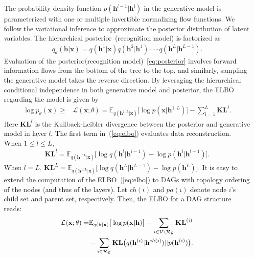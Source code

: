 \documentclass[twoside]{article}
\begin{document}
The  probability  density function $p(\mathbf{h}^{l-1} | \mathbf{h}^{l})$ in the generative model is parameterized with one or multiple invertible normalizing flow functions.  We follow the variational inference  to approximate the posterior distribution of latent variables. 
The hierarchical posterior~(recognition model) is factorized as
\begin{align}\label{eq:posterior}
q_{\theta}(\mathbf{h}| \mathbf{x}) =  q(\mathbf{h}^1 | \mathbf{x})  q(\mathbf{h}^2 | \mathbf{h}^1) \cdot \cdot  \cdot  q(\mathbf{h}^{L} | \mathbf{h}^{L-1}).
\end{align}%
Evaluation of the posterior(recognition model)~\eqref{eq:posterior} involves forward information flows from the bottom of the tree to the top, and similarly, sampling  the generative model takes the reverse direction. By leveraging the hierarchical conditional independence in both  generative model and  posterior,  the ELBO regarding the model is given by %
\begin{align} \label{eq:elbo}
    \log p_{\theta}(\mathbf{x})
    \geqslant & \mathcal{L}(\mathbf{x}; \theta) 
    = \mathbb{E}_{q(\mathbf{h}^{1:L}|\mathbf{x})}\big[ \log p(\mathbf{x}|\mathbf{h}^{1:L})  \big] - \sum_{l=1}^{L} \mathbf{KL}^l.
\end{align}%
Here $\mathbf{KL}^l$ is the Kullback-Leibler divergence between the posterior and generative model in layer $l$. The first term in~(\ref{eq:elbo}) evaluates data reconstruction.  %
When $1\leqslant l \leqslant L$, 
\begin{align}\label{eq:kl}
\mathbf{KL}^l 
=\mathbb{E}_{q(\mathbf{h}^{1:L}|\mathbf{x})}\big[  \log q(\mathbf{h}^{l}|\mathbf{h}^{l-1})   - \log p(\mathbf{h}^{l}|\mathbf{h}^{l+1}) \big].
\end{align}%
When $l=L$, 
$\mathbf{KL}^L =  \mathbb{E}_{q(\mathbf{h}^{1:L}|\mathbf{x})}\big[  \log q(\mathbf{h}^{L}|\mathbf{h}^{L-1})- \log p(\mathbf{h}^{L})  \big].$ It is easy to extend the computation of the ELBO~(\ref{eq:elbo}) to DAGs with topology ordering of the nodes (and thus of the layers). 
Let $ch(i)$ and $pa(i)$ denote node $i$'s child set and parent set, respectively.
Then, the ELBO for a DAG structure reads:
\begin{align}\label{eq:elbo_dag}
\mathcal{L}(\mathbf{x}; \theta) =& \mathbb{E}_{q(\mathbf{h}|\mathbf{x})}\big[ \log p(\mathbf{x}|\mathbf{h})  \big] -  \sum_{i \in \mathcal{V}  \setminus  \mathcal{R}_{ \mathcal{G} }} \textbf{\text{KL}}^{(i)}  \\ \notag
&-    \sum_{i \in  \mathcal{R}_{ \mathcal{G} }  }  \textbf{\text{KL}}\big(q(\mathbf{h}^{(i)} | \mathbf{h}^{ch(i)} )   || p(\mathbf{h}^{(i)})  \big) .
\end{align}
\end{document}
